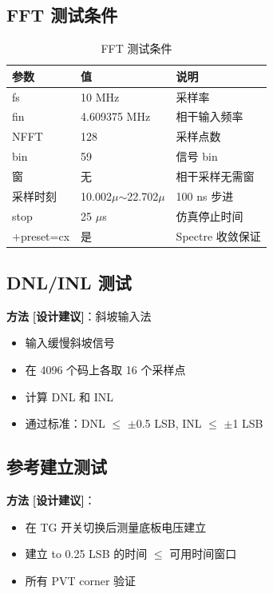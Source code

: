 \documentclass[UTF8,a4paper,11pt]{ctexart}
\newcommand{\suggested}{\textcolor{suggestblue}{\textbf{[设计建议]}}}
\providecommand{\textmu}{\ensuremath{\mu}}
\begin{document}
\subsection{FFT 测试条件}

\begin{table}[H]
\centering
\caption{FFT 测试条件}
\label{tab:fft-cond}
\begin{tabular}{lll}
\toprule
参数 & 值 & 说明 \\
\midrule
fs        & 10 MHz       & 采样率 \\
fin       & 4.609375 MHz & 相干输入频率 \\
NFFT      & 128          & 采样点数 \\
bin       & 59           & 信号 bin \\
窗        & 无           & 相干采样无需窗 \\
采样时刻  & 10.002\textmu$\sim$22.702\textmu & 100 ns 步进 \\
stop      & 25 \textmu s & 仿真停止时间 \\
+preset=cx & 是          & Spectre 收敛保证 \\
\bottomrule
\end{tabular}
\end{table}

\subsection{DNL/INL 测试}

\textbf{方法} \suggested：斜坡输入法
\begin{itemize}[leftmargin=2em]
\item 输入缓慢斜坡信号
\item 在 4096 个码上各取 16 个采样点
\item 计算 DNL 和 INL
\item 通过标准：DNL $\leq$ $\pm$0.5 LSB, INL $\leq$ $\pm$1 LSB
\end{itemize}

\subsection{参考建立测试}

\textbf{方法} \suggested：
\begin{itemize}[leftmargin=2em]
\item 在 TG 开关切换后测量底板电压建立
\item 建立 to 0.25 LSB 的时间 $\leq$ 可用时间窗口
\item 所有 PVT corner 验证
\end{itemize}
\end{document}
